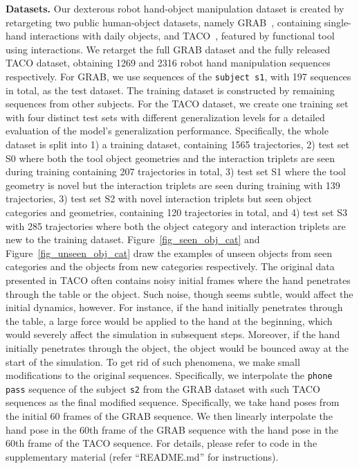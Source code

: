 \noindent\textbf{Datasets.} Our dexterous robot hand-object manipulation dataset is created by retargeting two public human-object datasets, namely GRAB~\cite{taheri2020grab}, containing single-hand interactions with daily objects, and TACO~\cite{liu2024taco}, featured by functional tool using interactions. We retarget the full GRAB dataset and the fully released TACO dataset, obtaining 1269 and 2316 robot hand manipulation sequences respectively. 
For GRAB, we use sequences of the \texttt{subject s1}, with  197 sequences in total, as the test dataset.  The training dataset is constructed by remaining sequences from other subjects. 
For the TACO dataset, we create one training set with four distinct test sets with different generalization levels for a detailed evaluation of the model's generalization performance.
Specifically, the whole dataset is split into 1) a training dataset, containing 1565 trajectories, 2) test set S0 where both the tool object geometries and the interaction triplets are seen during training containing 207 trajectories in total, 3) test set S1 where the tool geometry is novel but the interaction triplets are seen during training with 139 trajectories, 3) test set S2 with novel interaction triplets but seen object categories and geometries, containing 120 trajectories in total, and 4) test set S3 with 285 trajectories where both the object category and interaction triplets are new to the training dataset. 
Figure~\ref{fig_seen_obj_cat} and Figure~\ref{fig_unseen_obj_cat} draw the examples of unseen objects from seen categories and the objects from new categories respectively. 
The original data presented in TACO often contains noisy initial frames where the hand penetrates through the table or the object. Such noise, though seems subtle, would affect the initial dynamics, however. For instance, if the hand initially penetrates through the table, a large force would be applied to the hand at the beginning, which would severely affect the simulation in subsequent steps. Moreover, if the hand initially penetrates through the object, the object would be bounced away at the start of the simulation. To get rid of such phenomena, we make small modifications to the original sequences. Specifically, we interpolate the \texttt{phone pass} sequence of the subject \texttt{s2} from the GRAB dataset with such TACO sequences as the final modified sequence. Specifically, we take hand poses from the initial 60 frames of the GRAB sequence. We then linearly interpolate the hand pose in the 60th frame of the GRAB sequence with the hand pose in the 60th frame of the TACO sequence. For details, please refer to code in the supplementary material (refer ``README.md'' for instructions). 
